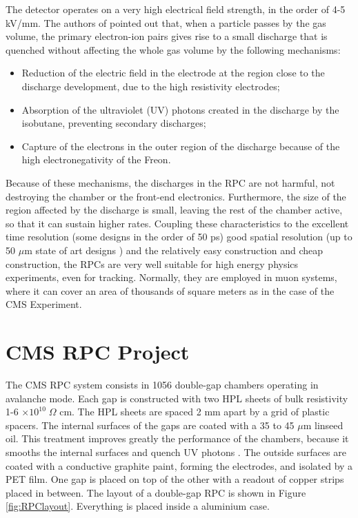 The detector operates on a very high electrical field strength, in the order of 4-5 kV/mm. The authors of \cite{Santonico:1988qi} pointed out that, when a particle passes by the gas volume, the primary electron-ion pairs gives rise to a small discharge that is quenched without affecting the whole gas volume by the following mechanisms:
\begin{itemize}
    \item Reduction of the electric field in the electrode at the region close to the discharge development, due to the high resistivity electrodes;
    \item Absorption of the ultraviolet (UV) photons created in the discharge by the isobutane, preventing secondary discharges;
    \item Capture of the electrons in the outer region of the discharge because of the high electronegativity of the Freon.
\end{itemize}

Because of these mechanisms, the discharges in the RPC are not harmful, not destroying the chamber or the front-end electronics. Furthermore, the size of the region affected by the discharge is small, leaving the rest of the chamber active, so that it can sustain higher rates. Coupling these characteristics to the excellent time resolution (some designs in the order of 50 ps) good spatial resolution (up to 50 $\mu$m state of art designs \cite{Francke:2002wq}) and the relatively easy construction and cheap construction, the RPCs are very well suitable for high energy physics experiments, even for tracking. Normally, they are employed in muon systems, where it can cover an area of thousands of square meters as in the case of the CMS Experiment.

\section{CMS RPC Project}

The CMS RPC system consists in 1056 double-gap chambers operating in avalanche mode. Each gap is constructed with two HPL sheets of bulk resistivity 1-6 $\times 10^{10} \; \Omega$ cm. The HPL sheets are spaced 2 mm apart by a grid of plastic spacers. The internal surfaces of the gaps are coated with a 35 to 45 $\mu$m linseed oil. This treatment improves greatly the performance of the chambers, because it smooths the internal surfaces and quench UV photons \cite{Abbrescia:687074, Lu:2009zzd}. The outside surfaces are coated with a conductive graphite paint, forming the electrodes, and isolated by a PET film. One gap is placed on top of the other with a readout of copper strips placed in between. The layout of a double-gap RPC is shown in Figure \ref{fig:RPClayout}. Everything is placed inside a aluminium case.

